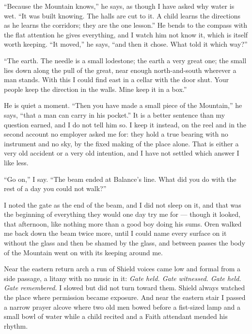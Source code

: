 ``Because the Mountain knows,'' he says, as though I have asked why water is wet. ``It was built knowing. The halls are cut to it. A child learns the directions as he learns the corridors; they are the one lesson.'' He bends to the compass with the flat attention he gives everything, and I watch him not know it, which is itself worth keeping. ``It moved,'' he says, ``and then it chose. What told it which way?''\par

``The earth. The needle is a small lodestone; the earth a very great one; the small lies down along the pull of the great, near enough north-and-south wherever a man stands. With this I could find east in a cellar with the door shut. Your people keep the direction in the walls. Mine keep it in a box.''\par

He is quiet a moment. ``Then you have made a small piece of the Mountain,'' he says, ``that a man can carry in his pocket.'' It is a better sentence than my question earned, and I do not tell him so. I keep it instead, on the reel and in the second account no employer asked me for: they hold a true bearing with no instrument and no sky, by the fixed making of the place alone. That is either a very old accident or a very old intention, and I have not settled which answer I like less.\par

``Go on,'' I say. ``The beam ended at Balance's line. What did you do with the rest of a day you could not walk?''\par

\ornament

\noindent I noted the gate as the end of the beam, and I did not sleep on it, and that was the beginning of everything they would one day try me for --- though it looked, that afternoon, like nothing more than a good boy doing his sums. Oren walked me back down the beam twice more, until I could name every surface on it without the glass and then be shamed by the glass, and between passes the body of the Mountain went on with its keeping around me.\par

Near the eastern return arch a run of Shield voices came low and formal from a side passage, a litany with no music in it: \textit{Gate held. Gate witnessed. Gate held. Gate remembered.} I slowed but did not turn toward them. Shield always watched the place where permission became exposure. And near the eastern stair I passed a narrow prayer alcove where two old men bowed before a fist-sized lamp and a small bowl of water while a child recited and a Faith attendant mended his rhythm.\par

